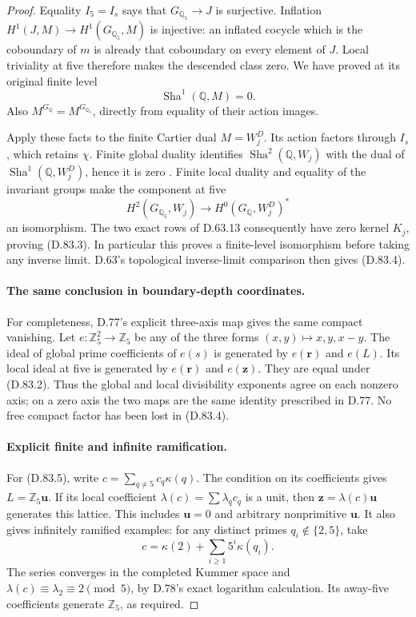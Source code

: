 \begin{proof}
Equality \(I_5=I_s\) says that \(G_{\mathbb Q_5}\to J\)
is surjective. Inflation
\(H^1(J,M)\to H^1(G_{\mathbb Q_5},M)\) is injective:
an inflated cocycle which is the coboundary of \(m\)
is already that coboundary on every element of \(J\).
Local triviality at five therefore makes the descended
class zero. We have proved at its original finite level
\[
                       \operatorname{Sha}^1(\mathbb Q,M)=0.
                                                                  \tag{D.83.12}
\]
Also \(M^{G_{\mathbb Q}}=M^{G_{\mathbb Q_5}}\), directly
from equality of their action images.

Apply these facts to the finite Cartier dual \(M=W_j^D\).
Its action factors through \(I_s\), which retains \(\chi\).
Finite global duality identifies
\(\operatorname{Sha}^2(\mathbb Q,W_j)\) with the dual of
\(\operatorname{Sha}^1(\mathbb Q,W_j^D)\), hence it is zero
\cite[I, Theorem 4.10(a)]{DE_MilneADT}.
Finite local duality and equality of the invariant groups
make the component at five
\[
 H^2(G_{\mathbb Q_5},W_j)
            \longrightarrow H^0(G_{\mathbb Q},W_j^D)^*
\]
an isomorphism. The two exact rows of D.63.13 consequently
have zero kernel \(K_j\), proving (D.83.3). In particular
this proves a finite-level isomorphism before taking
any inverse limit. D.63's topological inverse-limit
comparison then gives (D.83.4).

\paragraph{The same conclusion in boundary-depth coordinates.}
For completeness, D.77's explicit three-axis map gives
the same compact vanishing. Let \(e:\mathbb Z_5^2\to\mathbb Z_5\)
be any of the three forms \((x,y)\mapsto x,y,x-y\).
The ideal of global prime coefficients of \(e(s)\) is
generated by \(e(\mathbf r)\) and \(e(L)\). Its local
ideal at five is generated by \(e(\mathbf r)\) and
\(e(\mathbf z)\). They are equal under (D.83.2).
Thus the global and local divisibility exponents agree
on each nonzero axis; on a zero axis the two maps are
the same identity prescribed in D.77. No free compact
factor has been lost in (D.83.4).

\paragraph{Explicit finite and infinite ramification.}
For (D.83.5), write \(c=\sum_{q\ne5}c_q\kappa(q)\).
The condition on its coefficients gives
\(L=\mathbb Z_5\mathbf u\). If its local coefficient
\(\lambda(c)=\sum\lambda_qc_q\) is a unit, then
\(\mathbf z=\lambda(c)\mathbf u\) generates this lattice.
This includes \(\mathbf u=0\) and arbitrary nonprimitive
\(\mathbf u\). It also gives infinitely ramified examples:
for any distinct primes \(q_i\notin\{2,5\}\), take
\[
                       c=\kappa(2)+\sum_{i\ge1}5^i\kappa(q_i).
                                                                  \tag{D.83.13}
\]
The series converges in the completed Kummer space and
\(\lambda(c)\equiv\lambda_2\equiv2\pmod5\), by D.78's
exact logarithm calculation. Its away-five coefficients
generate \(\mathbb Z_5\), as required.


\end{proof}
